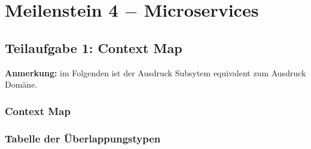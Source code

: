 \section{Meilenstein 4 $-$ Microservices}

\subsection{Teilaufgabe 1: Context Map}

\textbf{Anmerkung:} im Folgenden ist der Ausdruck Subsytem
equivalent zum Ausdruck Dom\"ane.

\subsubsection{Context Map}


\subsubsection{Tabelle der \"Uberlappungstypen}

